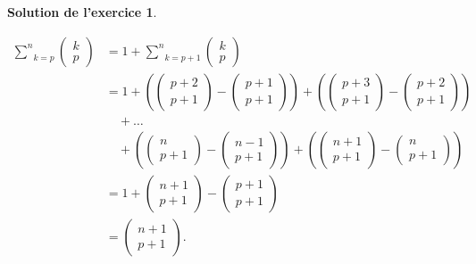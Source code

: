 \documentclass[a4paper, 11pt,openany]{article}%
\theoremstyle{plain}
\theoremstyle{definition}
\newtheorem{sol}{Solution de l'exercice}
\theoremstyle{remark}
\begin{document}
\begin{sol}
\begin{enumerate}
\begin{align*}
\underset{k=p}{\overset{n}{\sum}} \begin{pmatrix} k \\ p \end{pmatrix}  &= 1 + \underset{k=p+1}{\overset{n}{\sum}} \begin{pmatrix} k \\ p \end{pmatrix} \\
  & =  1+ \left( \begin{pmatrix} p+2 \\ p+1 \end{pmatrix} - \begin{pmatrix} p+1\\ p+1 \end{pmatrix} \right) + \left( \begin{pmatrix} p+3 \\ p+1 \end{pmatrix} - \begin{pmatrix} p+2\\ p+1 \end{pmatrix} \right)\\ 
 &  \quad + \dots  \\ 
 &\quad + \left( \begin{pmatrix} n \\ p+1 \end{pmatrix} - \begin{pmatrix} n-1 \\ p+1 \end{pmatrix} \right) + \left( \begin{pmatrix} n+1 \\ p+1 \end{pmatrix} - \begin{pmatrix} n\\ p+1 \end{pmatrix}\right) \\
&= 1 + \begin{pmatrix} n+1 \\ p+1 \end{pmatrix} - \begin{pmatrix} p+1\\ p+1 \end{pmatrix} \\
&= \begin{pmatrix} n+1 \\ p+1 \end{pmatrix}.
\end{align*}

     \end{enumerate}
\end{sol}
\end{document}
